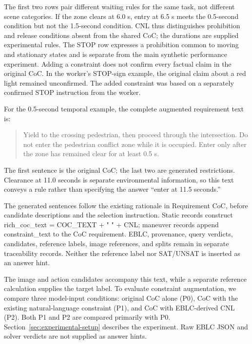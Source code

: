 \documentclass[nolineno]{ieeeaccess}
\begin{document}
The first two rows pair different waiting rules for the same task, not different scene categories. If the zone clears at 6.0 s, entry at 6.5 s meets the 0.5-second condition but not the 1.5-second condition. CNL thus distinguishes prohibition and release conditions absent from the shared CoC; the durations are supplied experimental rules. The STOP row expresses a prohibition common to moving and stationary states and is separate from the main synthetic performance experiment. Adding a constraint does not confirm every factual claim in the original CoC. In the worker's STOP-sign example, the original claim about a red light remained unconfirmed. The added constraint was based on a separately confirmed STOP instruction from the worker.\par

For the 0.5-second temporal example, the complete augmented requirement text is:\par

\begin{quote}\small Yield to the crossing pedestrian, then proceed through the intersection. Do not enter the pedestrian conflict zone while it is occupied. Enter only after the zone has remained clear for at least 0.5 s.\end{quote}

The first sentence is the original CoC; the last two are generated restrictions. Clearance at 11.0 seconds is separate environmental information, so this text conveys a rule rather than specifying the answer “enter at 11.5 seconds.”\par

The generated sentences follow the existing rationale in {\ttfamily{}\selectfont\footnotesize Requirement CoC}, before candidate descriptions and the selection instruction. Static records construct {\ttfamily{}\selectfont\footnotesize rich\_\allowbreak coc\_\allowbreak text = COC\_\allowbreak TEXT + " " + CNL}; maneuver records append {\ttfamily{}\selectfont\footnotesize constraint\_\allowbreak text} to the CoC requirement. EBLC, provenance, query verdicts, candidates, reference labels, image references, and splits remain in separate traceability records. Neither the reference label nor SAT/UNSAT is inserted as an answer hint.\par

The image and action candidates accompany this text, while a separate reference calculation supplies the target label. To evaluate constraint augmentation, we compare three model-input conditions: original CoC alone (P0), CoC with the existing natural-language constraint (P1), and CoC with EBLC-derived CNL (P2). Both P1 and P2 are compared primarily with P0. Section~\ref{sec:experimental-setup} describes the experiment. Raw EBLC JSON and solver verdicts are not supplied as answer hints.\par
\end{document}
